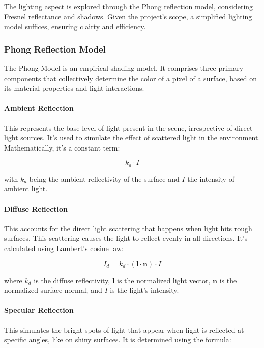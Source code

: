 The lighting aspect is explored through the Phong reflection model, considering Fresnel reflectance and shadows. Given the project's scope, a simplified lighting model suffices, ensuring clairty and efficiency.

\subsubsection{Phong Reflection Model}
\label{Phong}

The Phong Model is an empirical shading model. It comprises three primary components that collectively determine the color of a pixel of a surface,  based on its material properties and light interactions.

\paragraph{Ambient Reflection} This represents the base level of light present in the scene, irrespective of direct light sources. It's used to simulate the effect of scattered light in the environment. Mathematically, it's a constant term:

\begin{equation}
\label{ambient}
k_a \cdot I
\end{equation}

with $k_a$ being the ambient reflectivity of the surface and $I$ the intensity of ambient light.

\paragraph{Diffuse Reflection} This accounts for the direct light scattering that happens when light hits rough surfaces. This scattering causes the light to reflect evenly in all directions. It's calculated using Lambert’s cosine law: 
    
\begin{equation}
\label{diffuse}
I_d = k_d \cdot (\mathbf{l} \cdot \mathbf{n}) \cdot I
\end{equation}

where $k_d$ is the diffuse reflectivity, $\mathbf{l}$ is the normalized light vector, $\mathbf{n}$ is the normalized surface normal, and $I$ is the light's intensity.
    
\paragraph{Specular Reflection} This simulates the bright spots of light that appear when light is reflected at specific angles, like on shiny surfaces. It is determined using the formula: 

